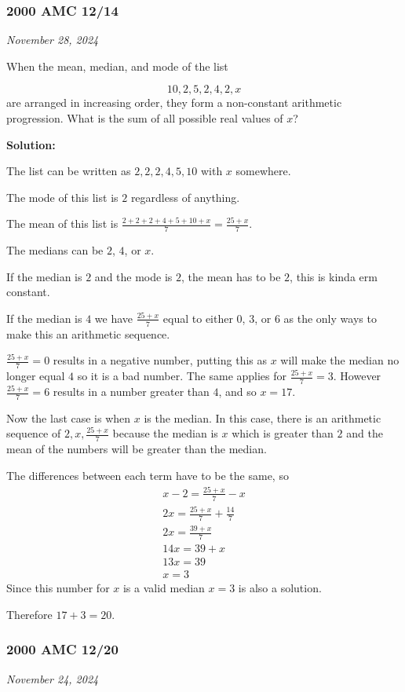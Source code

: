 \documentclass[../mathproblems.tex]{subfiles}
\begin{document}
\noindent\hrulefill
\subsubsection*{2000 AMC 12/14} 
\textit{November 28, 2024}

When the mean, median, and mode of the list

\[10,2,5,2,4,2,x\]
are arranged in increasing order, they form a non-constant arithmetic progression. What is the sum of all possible real values of $x$?

\textbf{Solution:}

The list can be written as $2,2,2,4,5,10$ with $x$ somewhere.

The mode of this list is $2$ regardless of anything.

The mean of this list is $\frac{2+2+2+4+5+10+x}{7} = \frac{25+x}{7}$.

The medians can be $2$, $4$, or $x$.

If the median is $2$ and the mode is $2$, the mean has to be $2$, this is kinda erm constant.

If the median is $4$ we have $\frac{25+x}{7}$ equal to either $0$, $3$, or $6$ as the only ways to make this an arithmetic sequence.

$\frac{25+x}{7} = 0$ results in a negative number, putting this as $x$ will make the median no longer equal $4$ so it is a bad number. The same applies for $\frac{25+x}{7} = 3$. However $\frac{25+x}{7}=6$ results in a number greater than $4$, and so $x=17$.

Now the last case is when $x$ is the median. In this case, there is an arithmetic sequence of $2,x,\frac{25+x}{7}$ because the median is $x$ which is greater than $2$ and the mean of the numbers will be greater than the median.

The differences between each term have to be the same, so
\begin{align*} x-2 = \frac{25+x}{7}-x\\ 2x = \frac{25+x}{7}+\frac{14}{7}\\ 2x = \frac{39+x}{7}\\ 14x = 39+x\\ 13x = 39 \\ x = 3 \end{align*}
Since this number for $x$ is a valid median $x=3$ is also a solution.

Therefore $17+3 = \boxed{20}$.

\noindent\hrulefill
\subsubsection*{2000 AMC 12/20} 
\textit{November 24, 2024}
\end{document}
